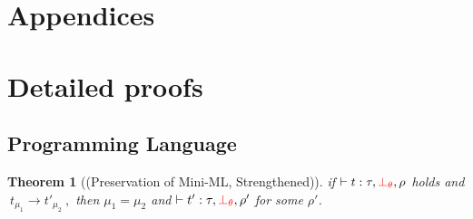 \documentclass[a4paper,11pt,oneside]{article}
\theoremstyle{plain}
\newtheorem{theorem}[definition]{Theorem}
\newcommand{\bth}{\bot_\theta}
\newcommand{\evalstep}[4]{~#1_{\mu_#2} \rightarrow #3_{\mu_#4} ~}
\begin{document}
\section*{Appendices}
\newpage
\appendix


\section{Detailed proofs} 

 \subsection{Programming Language}

\begin{theorem}[(Preservation of Mini-ML, Strengthened)] 
if $\vdash t : \tau, \textcolor{red}{\bth}, \rho$ holds and $\evalstep{t}{1}{t'}{2},$ then $\mu_1 = \mu_2$ and $\vdash t' : \tau, \textcolor{red}{\bth}, \rho'$ for some $\rho'$.

\end{theorem}
\end{document}
